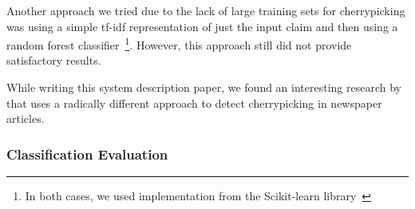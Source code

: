 Another approach we tried due to the lack of large training sets for cherrypicking was using a simple tf-idf representation of just the input claim and then using a random forest classifier~\footnote{In both cases, we used implementation from the Scikit-learn library~\cite{scikit-learn}}. However, this approach still did not provide satisfactory results.

While writing this system description paper, we found an interesting research by~\citet{jaradat2024contextawaredetectioncherrypickingnews} that uses a radically different approach to detect cherrypicking in newspaper articles.


\subsubsection{Classification Evaluation}


